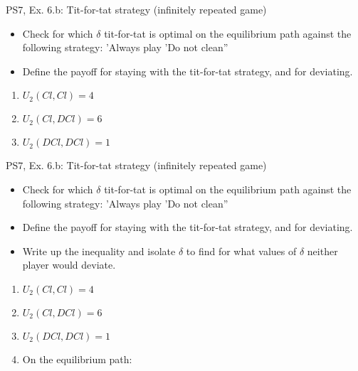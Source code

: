 \begin{frame}{PS7, Ex. 6.b: Tit-for-tat strategy (infinitely repeated game)}
    \begin{itemize}
    \item[(b)] Check for which $\delta$ tit-for-tat is optimal on the equilibrium path against the following strategy: ’Always play ’Do not clean”
    \end{itemize}
  \begin{multicols}{2}
  \begin{itemize}
      \item[(Step a)] Define the payoff for staying with the tit-for-tat strategy, and for deviating.
  \end{itemize}
    \vfill\null\columnbreak
    \begin{enumerate}
        \item $U_2(Cl,Cl) = 4$
        \item $U_2(Cl,DCl) = 6$
        \item $U_2(DCl,DCl) = 1$
    \end{enumerate}
    \vfill\null
  \end{multicols}
\end{frame}

\begin{frame}{PS7, Ex. 6.b: Tit-for-tat strategy (infinitely repeated game)}
    \begin{itemize}
    \item[(b)] Check for which $\delta$ tit-for-tat is optimal on the equilibrium path against the following strategy: ’Always play ’Do not clean”
    \end{itemize}
  \begin{multicols}{2}
  \begin{itemize}
      \item[(Step a)] Define the payoff for staying with the tit-for-tat strategy, and for deviating.
      \item[(Step b)] Write up the inequality and isolate $\delta$ to find for what values of $\delta$ neither player would deviate.
  \end{itemize}
    \vfill\null\columnbreak
    \begin{enumerate}
        \item $U_2(Cl,Cl) = 4$
        \item $U_2(Cl,DCl) = 6$
        \item $U_2(DCl,DCl) = 1$
        \item On the equilibrium path:
    \end{enumerate}
    \vfill\null
  \end{multicols}
\end{frame}


